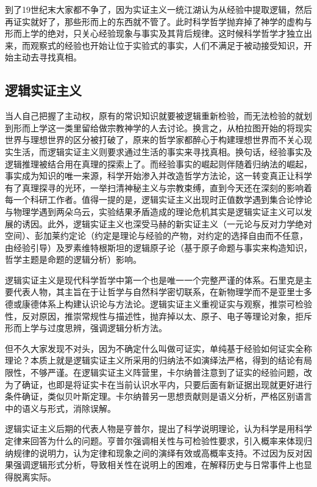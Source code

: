 \documentclass[]{tufte-book}
\begin{document}
到了19世纪末大家都不争了，因为实证主义一统江湖认为从经验中提取逻辑，然后再证实就好了，那些形而上的东西就不管了。此时科学哲学抛弃掉了神学的虚构与形而上学的绝对，只关心经验现象与事实及其背后规律。这时候科学哲学才独立出来，而观察式的经验也开始让位于实验式的事实，人们不满足于被动接受知识，开始主动去寻找真相。

\hypertarget{ux903bux8f91ux5b9eux8bc1ux4e3bux4e49}{%
\subsection{逻辑实证主义}\label{ux903bux8f91ux5b9eux8bc1ux4e3bux4e49}}

当人自己把握了主动权，原有的常识知识就要被逻辑重新检验，而无法检验的就划到形而上学这一类里留给做宗教神学的人去讨论。换言之，从柏拉图开始的将现实世界与理想世界的区分被打破了，原来的哲学家都醉心于构建理想世界而不关心现实生活，而逻辑实证主义则要求通过生活的事实来寻找真相。换句话，经验事实及逻辑推理被结合用在真理的探索上了。而经验事实的崛起则伴随着归纳法的崛起，事实成为知识的唯一来源，科学开始渗入并改造哲学方法论，这一转变真正让科学有了真理探寻的光环，一举扫清神秘主义与宗教束缚，直到今天还在深刻的影响着每一个科研工作者。值得一提的是，逻辑实证主义出现时正值数学遇到集合论悖论与物理学遇到两朵乌云，实验结果矛盾造成的理论危机其实是逻辑实证主义可以发展的诱因。此外，逻辑实证主义也深受马赫的新实证主义（一元论与反对力学绝对空间）、彭加莱约定论（约定是理论与经验的产物，对约定的选择自由而不任意，由经验引导）及罗素维特根斯坦的逻辑原子论（基于原子命题与事实来构造知识，哲学主题是命题的逻辑分析）影响。

逻辑实证主义是现代科学哲学中第一个也是唯一一个完整严谨的体系。石里克是主要代表人物，其主旨在于让哲学与自然科学密切联系，在新物理学而不是亚里士多德或康德体系上构建认识论与方法论。逻辑实证主义重视证实与观察，推崇可检验性，反对原因，推崇常规性与描述性，抛弃掉以太、原子、电子等理论对象，拒斥形而上学与过度思辨，强调逻辑分析方法。

但不久大家发现不对头，因为不确定什么叫做可证实，单纯基于经验如何证实全称理论？本质上就是逻辑实证主义所采用的归纳法不如演绎法严格，得到的结论有局限性，不够严谨。在逻辑实证主义阵营里，卡尔纳普注意到了证实的经验问题，改为了确证，也即是将证实卡在当前认识水平内，只要后面有新证据出现就更好进行条件确证，类似贝叶斯定理。卡尔纳普另一思想贡献则是语义分析，严格区别语言中的语义与形式，消除误解。

逻辑实证主义后期的代表人物是亨普尔，提出了科学说明理论，认为科学是用科学定律来回答为什么的问题。亨普尔强调相关性与可检验性要求，引入概率来体现归纳规律的说明力，认为定律和现象之间的演绎有效或高概率支持。不过因为反对因果强调逻辑形式分析，导致相关性在说明上的困难，在解释历史与日常事件上也显得脱离实际。
\end{document}
